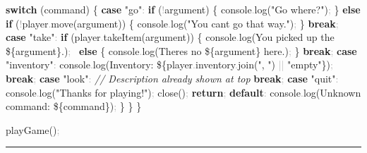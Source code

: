 \documentclass[
  justified,
  openright,
]{tufte-book}
\newcommand{\KeywordTok}[1]{\textcolor{CodeKeyword}{\textbf{#1}}}  %
\newcommand{\StringTok}[1]{\textcolor{CodeString}{#1}}              %
\newcommand{\CommentTok}[1]{\textcolor{CodeComment}{\textit{#1}}}  %
\newcommand{\CodeFuncTok}[1]{\textcolor{CodeKeyword}{#1}}           %
\newcommand{\CodeTypeTok}[1]{\textcolor{CodeType}{#1}}              %
\newcommand{\OperatorTok}[1]{\textcolor{DarkGray}{#1}}              %
\newenvironment{Shaded}{%
  \begin{mdframed}[style=TufteCode]%
}{%
  \end{mdframed}%
}
\begin{document}
\begin{Shaded}
\begin{Highlighting}[]
    \KeywordTok{switch} (command) \{
      \KeywordTok{case} \StringTok{"go"}\OperatorTok{:}
        \KeywordTok{if} (\OperatorTok{!}argument) \{
          console\OperatorTok{.}\CodeFuncTok{log}(\StringTok{"Go where?"})\OperatorTok{;}
        \} \KeywordTok{else} \KeywordTok{if} (\OperatorTok{!}player\OperatorTok{.}\CodeFuncTok{move}(argument)) \{
          console\OperatorTok{.}\CodeFuncTok{log}(\StringTok{"You can\textquotesingle{}t go that way."})\OperatorTok{;}
        \}
        \KeywordTok{break}\OperatorTok{;}
      \KeywordTok{case} \StringTok{"take"}\OperatorTok{:}
        \KeywordTok{if} (player\OperatorTok{.}\CodeFuncTok{takeItem}(argument)) \{
          console\OperatorTok{.}\CodeFuncTok{log}(\StringTok{\textasciigrave{}You picked up the }\StringTok{\$\{}argument\StringTok{\}}\StringTok{.\textasciigrave{}})\OperatorTok{;}
        \ \KeywordTok{else} \{
          console\OperatorTok{.}\CodeFuncTok{log}(\StringTok{\textasciigrave{}There\textquotesingle{}s no }\StringTok{\$\{}argument\StringTok{\}}\StringTok{ here.\textasciigrave{}})\OperatorTok{;}
        \}
        \KeywordTok{break}\OperatorTok{;}
      \KeywordTok{case} \StringTok{"inventory"}\OperatorTok{:}
        console\OperatorTok{.}\CodeFuncTok{log}(\StringTok{\textasciigrave{}Inventory: }\StringTok{\$\{}player\OperatorTok{.}\CodeTypeTok{inventory}\OperatorTok{.}\CodeFuncTok{join}(\StringTok{", "}) \OperatorTok{||} \StringTok{"empty"}\StringTok{\}}\StringTok{\textasciigrave{}})\OperatorTok{;}
        \KeywordTok{break}\OperatorTok{;}
      \KeywordTok{case} \StringTok{"look"}\OperatorTok{:}
        \CommentTok{// Description already shown at top}
        \KeywordTok{break}\OperatorTok{;}
      \KeywordTok{case} \StringTok{"quit"}\OperatorTok{:}
        console\OperatorTok{.}\CodeFuncTok{log}(\StringTok{"Thanks for playing!"})\OperatorTok{;}
        \CodeFuncTok{close}()\OperatorTok{;}
        \KeywordTok{return}\OperatorTok{;}
      \KeywordTok{default}\OperatorTok{:}
        console\OperatorTok{.}\CodeFuncTok{log}(\StringTok{\textasciigrave{}Unknown command: \textquotesingle{}}\StringTok{\$\{}command\StringTok{\}}\StringTok{\textquotesingle{}\textasciigrave{}})\OperatorTok{;}
    \}
  \}
\}
 
\CodeFuncTok{playGame}()\OperatorTok{;}
\end{Highlighting}
\end{Shaded}

\begin{center}\rule{0.5\linewidth}{0.5pt}\end{center}
\end{document}
